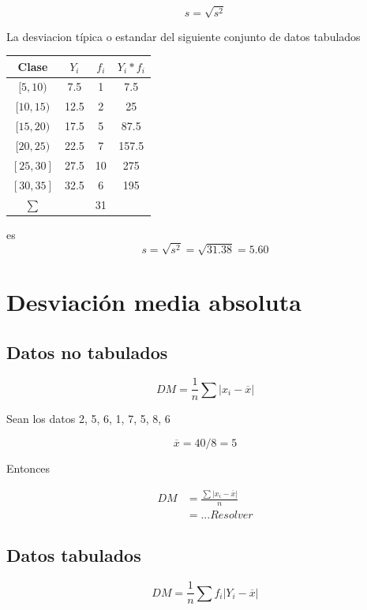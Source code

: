 \documentclass[
  11pt,
]{krantz}
\theoremstyle{definition}
\theoremstyle{definition}
\theoremstyle{definition}
\theoremstyle{definition}
\theoremstyle{remark}
\begin{document}
\[s=\sqrt{s^2}\]

La desviacion típica o estandar del siguiente conjunto de datos tabulados

\begin{longtable}[]{@{}cccc@{}}
\toprule
Clase & \(Y_i\) & \(f_i\) & \(Y_i*f_i\) \\
\midrule
\endhead
\([5,10)\) & 7.5 & 1 & 7.5 \\
\([10,15)\) & 12.5 & 2 & 25 \\
\([15,20)\) & 17.5 & 5 & 87.5 \\
\([20,25)\) & 22.5 & 7 & 157.5 \\
\([25,30]\) & 27.5 & 10 & 275 \\
\([30,35]\) & 32.5 & 6 & 195 \\
\(\sum\) & & 31 & \\
\bottomrule
\end{longtable}

es \[s=\sqrt{s^2}=\sqrt{31.38}=5.60\]

\hypertarget{desviaciuxf3n-media-absoluta}{%
\section{Desviación media absoluta}\label{desviaciuxf3n-media-absoluta}}

\hypertarget{datos-no-tabulados-1}{%
\subsection{Datos no tabulados}\label{datos-no-tabulados-1}}

\[DM=\frac{1}{n}\sum \left\vert x_i-\overline{x}\right\vert\]

Sean los datos 2, 5, 6, 1, 7, 5, 8, 6

\[\overline{x}=40/8=5\]

Entonces

\[
\begin{aligned}
DM&=\frac{\sum\left\vert x_i-\overline{x}\right \vert}{n}\\
&=... Resolver
\end{aligned}
\]

\hypertarget{datos-tabulados-1}{%
\subsection{Datos tabulados}\label{datos-tabulados-1}}

\[DM=\frac{1}{n}\sum f_i \left \vert Y_i-\overline{x}\right\vert\]
\end{document}
